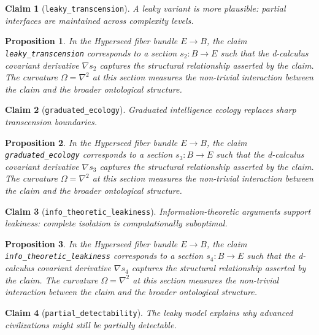 \documentclass{article}
\newtheorem{claim}{Claim}
\newtheorem{proposition}{Proposition}
\begin{document}
\begin{claim}[\texttt{leaky_transcension}]
A leaky variant is more plausible: partial interfaces are maintained across complexity levels.
\end{claim}

\begin{proposition}
In the Hyperseed fiber bundle $E \to B$, the claim \texttt{leaky_transcension} corresponds to a section $s_2: B \to E$ such that the d-calculus covariant derivative $\nabla s_2$ captures the structural relationship asserted by the claim. The curvature $\Omega = \nabla^2$ at this section measures the non-trivial interaction between the claim and the broader ontological structure.
\end{proposition}

\begin{claim}[\texttt{graduated_ecology}]
Graduated intelligence ecology replaces sharp transcension boundaries.
\end{claim}

\begin{proposition}
In the Hyperseed fiber bundle $E \to B$, the claim \texttt{graduated_ecology} corresponds to a section $s_3: B \to E$ such that the d-calculus covariant derivative $\nabla s_3$ captures the structural relationship asserted by the claim. The curvature $\Omega = \nabla^2$ at this section measures the non-trivial interaction between the claim and the broader ontological structure.
\end{proposition}

\begin{claim}[\texttt{info_theoretic_leakiness}]
Information-theoretic arguments support leakiness: complete isolation is computationally suboptimal.
\end{claim}

\begin{proposition}
In the Hyperseed fiber bundle $E \to B$, the claim \texttt{info_theoretic_leakiness} corresponds to a section $s_4: B \to E$ such that the d-calculus covariant derivative $\nabla s_4$ captures the structural relationship asserted by the claim. The curvature $\Omega = \nabla^2$ at this section measures the non-trivial interaction between the claim and the broader ontological structure.
\end{proposition}

\begin{claim}[\texttt{partial_detectability}]
The leaky model explains why advanced civilizations might still be partially detectable.
\end{claim}
\end{document}
